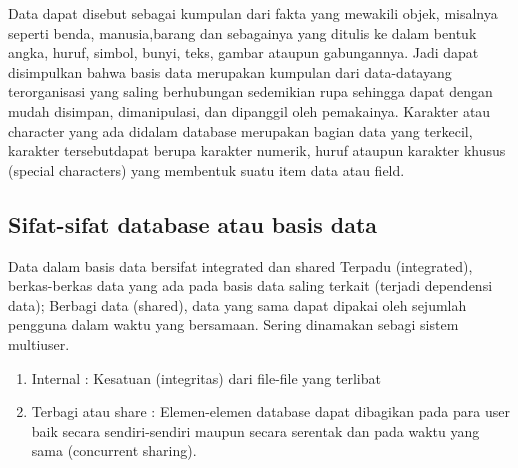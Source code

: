 	Data dapat disebut sebagai kumpulan dari fakta yang mewakili objek, misalnya seperti benda, manusia,barang dan sebagainya yang ditulis ke dalam bentuk angka, huruf, simbol, bunyi, teks, gambar ataupun gabungannya. Jadi dapat disimpulkan bahwa basis data merupakan kumpulan dari data-datayang terorganisasi yang saling berhubungan sedemikian rupa sehingga dapat dengan mudah disimpan, dimanipulasi, dan dipanggil oleh pemakainya. Karakter atau character yang ada didalam database merupakan bagian data yang terkecil, karakter tersebutdapat berupa karakter numerik, huruf ataupun karakter khusus (special characters) yang membentuk suatu item data atau field.

\subsection {Sifat-sifat database atau basis data}
	Data dalam basis data bersifat integrated dan shared Terpadu (integrated), berkas-berkas data yang ada pada basis data saling terkait (terjadi dependensi data);
	Berbagi data (shared), data yang sama dapat dipakai oleh sejumlah pengguna dalam waktu yang bersamaan. Sering dinamakan sebagi sistem multiuser.
	\begin{enumerate}
		\item Internal : 
			Kesatuan (integritas) dari file-file yang terlibat
		\item Terbagi atau share : 
			Elemen-elemen database dapat dibagikan pada para user baik secara sendiri-sendiri maupun secara serentak dan pada waktu yang sama (concurrent sharing).
	\end{enumerate}
 
